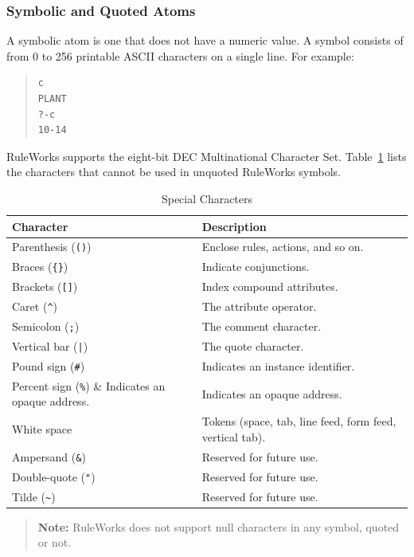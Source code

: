 \subsubsection{Symbolic and Quoted Atoms}

A symbolic atom is one that does not have a numeric value. A symbol
consists of from 0 to 256 printable ASCII characters on a single
line. For example:

\begin{quote}
\begin{verbatim}
c
PLANT
?-c
10-14
\end{verbatim}
\end{quote}

RuleWorks supports the eight-bit DEC Multinational Character
Set. Table~\ref{t:2-3} lists the characters that cannot be used in
unquoted RuleWorks symbols.

\begin{table}[h]
  \centering
  \begin{tabular}{ll}
    \toprule
    Character & Description \\
    \midrule
    Parenthesis (\verb|()|) & Enclose rules, actions, and so on. \\
    Braces (\verb|{}|) & Indicate conjunctions. \\
    Brackets (\verb|[]|) & Index compound attributes. \\
    Caret (\verb|^|) & The attribute operator. \\
    Semicolon (\verb|;|) & The comment character. \\
    Vertical bar (\verb,|,) & The quote character. \\
    Pound sign (\verb|#|)  & Indicates an instance identifier. \\
    Percent sign (\verb|%|) & Indicates an opaque address. \\
    White space & Tokens (space, tab, line feed, form feed, vertical tab). \\
    Ampersand (\verb|&|) & Reserved for future use.  \\
    Double-quote (\verb|"|) & Reserved for future use. \\
    Tilde (\verb|~|) & Reserved for future use. \\
    \bottomrule
  \end{tabular}
  \caption{Special Characters}
  \label{t:2-3}
\end{table}

\begin{quote}
  \textbf{Note:} RuleWorks does not support null characters in any
  symbol, quoted or not.
\end{quote}

